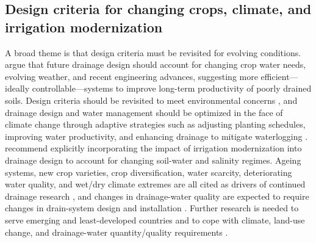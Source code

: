 \subsection{Design criteria for changing crops, climate, and irrigation modernization}
A broad theme is that design criteria must be revisited for evolving conditions. \textcite{Rui2024} argue that future drainage design should account for changing crop water needs, evolving weather, and recent engineering advances, suggesting more efficient---ideally controllable---systems to improve long-term productivity of poorly drained soils. Design criteria should be revisited to meet environmental concerns \parencite{Akram2013}, and drainage design and water management should be optimized in the face of climate change through adaptive strategies such as adjusting planting schedules, improving water productivity, and enhancing drainage to mitigate waterlogging \parencite{Ziaeifar2025}. \textcite{Ritzema2023} recommend explicitly incorporating the impact of irrigation modernization into drainage design to account for changing soil-water and salinity regimes. Ageing systems, new crop varieties, crop diversification, water scarcity, deteriorating water quality, and wet/dry climate extremes are all cited as drivers of continued drainage research \parencite{Ritzema2007}, and changes in drainage-water quality are expected to require changes in drain-system design and installation \parencite{Ritzema2006}. Further research is needed to serve emerging and least-developed countries and to cope with climate, land-use change, and drainage-water quantity/quality requirements \parencite{Ritzema2011}.

